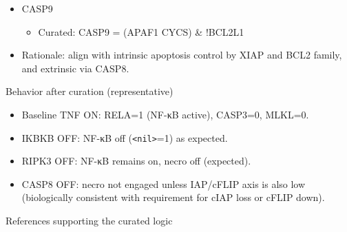 \begin{itemize}
\begin{itemize}
    \begin{itemize}
    \tightlist
    \item
      Curated: APAF1 = (BAX \textbar{} CYCS) \& !XIAP
    \end{itemize}
  \item
    CASP9

    \begin{itemize}
    \tightlist
    \item
      Curated: CASP9 = (APAF1 \textbar{} CYCS) \& !BCL2L1
    \end{itemize}
  \item
    Rationale: align with intrinsic apoptosis control by XIAP and BCL2
    family, and extrinsic via CASP8.
  \end{itemize}
\end{itemize}

Behavior after curation (representative)

\begin{itemize}
\tightlist
\item
  Baseline TNF ON: RELA=1 (NF-κB active), CASP3=0, MLKL=0.
\item
  IKBKB OFF: NF-κB off (\texttt{\textless{}nil\textgreater{}}=1) as
  expected.
\item
  RIPK3 OFF: NF-κB remains on, necro off (expected).
\item
  CASP8 OFF: necro not engaged unless IAP/cFLIP axis is also low
  (biologically consistent with requirement for cIAP loss or cFLIP
  down).
\end{itemize}

References supporting the curated logic

